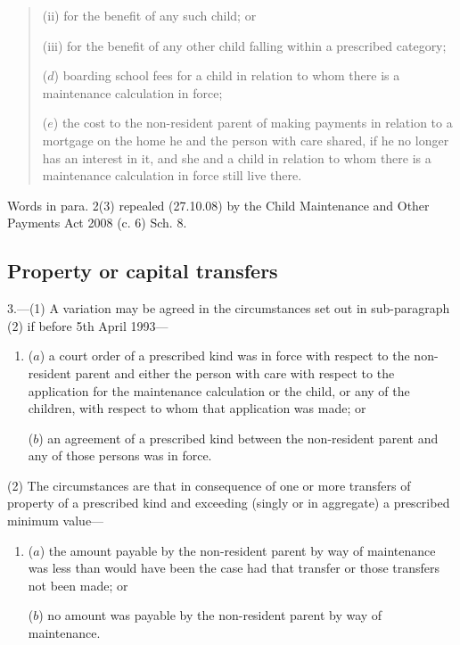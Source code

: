 \documentclass[12pt,a4paper]{article}
\begin{document}
{{\begin{quotation}
\begin{enumerate}
\begin{enumerate}
(ii)
for the benefit of any such child; or

(iii)
for the benefit of any other child falling within a
prescribed category;
\end{enumerate}

($d$) boarding school fees for a child in relation to whom there is a maintenance calculation in force;

($e$) the cost to the non-resident parent of making payments in relation to a mortgage on the home he and the person with care shared, if he no longer has an interest in it, and she and a child in relation to whom there is a maintenance calculation in force still live there.
\end{enumerate}
\end{quotation}

Words in para. 2(3) repealed (27.10.08) by the Child Maintenance and Other Payments Act 2008 (c. 6) Sch. 8.
}

\subsection*{Property or capital transfers}

3.—(1) A variation may be agreed in the circumstances set out in sub-paragraph
(2) if before 5th April 1993---
\begin{enumerate}\item[]
 ($a$) a court order of a prescribed kind was in force with respect to the non-resident parent and either the person with care with respect to the
application for the maintenance calculation or the child, or any of the children, with respect to whom that application was made; or

($b$) an agreement of a prescribed kind between the non-resident parent and any of those persons was in force.
\end{enumerate}

(2) The circumstances are that in consequence of one or more transfers of property of a prescribed kind and exceeding (singly or in aggregate) a prescribed minimum value---
\begin{enumerate}\item[]
($a$) the amount payable by the non-resident parent by way of maintenance was less than would have been the case had that transfer or those transfers not been made; or

($b$) no amount was payable by the non-resident parent by way of maintenance.
\end{enumerate}

}
\end{document}
